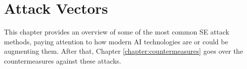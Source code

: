 


\chapter{Attack Vectors\label{chapter:attacks}}
\begin{comment}

Guides:
    - About 3-4 pages

TODO:
    [ ] 

What to cover:
    - Attacks
        - Deepfake generated synthetic media
            - Videos
            - Images
            - Audio
            - Real-time voice morphing
    
Literature:
    - 

\end{comment}


This chapter provides an overview of some of the most common SE attack methods, paying attention to how modern AI technologies are or could be augmenting them. After that, Chapter \ref{chapter:countermeasures} goes over the countermeasures against these attacks.





